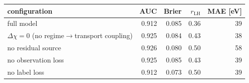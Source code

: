 \begin{tabular}{lrrrr}
\toprule
configuration & AUC & Brier & $r_{\mathrm{LH}}$ & MAE [eV] \\
\midrule
full model & 0.912 & 0.085 & 0.36 & 39 \\
$\Delta\chi = 0$ (no regime$\to$transport coupling) & 0.925 & 0.084 & 0.43 & 38 \\
no residual source & 0.926 & 0.080 & 0.50 & 58 \\
no observation loss & 0.925 & 0.085 & 0.43 & 39 \\
no label loss & 0.912 & 0.073 & 0.50 & 39 \\
\bottomrule
\end{tabular}